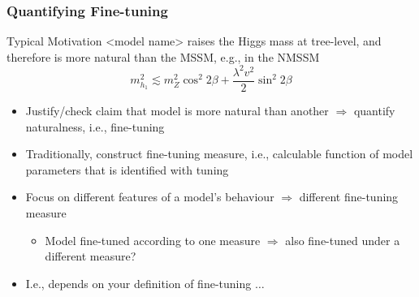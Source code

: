 \documentclass[10pt,aspectratio=169]{beamer}
\begin{document}
\begin{frame}
  \frametitle{Quantifying Fine-tuning}
  \begin{block}{Typical Motivation}
    <model name> raises the Higgs mass at tree-level, and
    therefore is more natural than the MSSM, e.g., in the NMSSM
    \begin{equation*}
      m_{h_1}^2 \lesssim m_Z^2 \cos^2 2\beta + \frac{\lambda^2 v^2}{2}
      \sin^2 2\beta
    \end{equation*}
  \end{block}
  \begin{itemize} \itemsep1em
  \item Justify/check claim that model is more natural than another
    $\Rightarrow$ quantify naturalness, i.e., fine-tuning
  \item Traditionally, construct {\color{blue} fine-tuning measure}, i.e.,
    calculable function of model parameters that is identified with tuning
  \item Focus on different features of a model's behaviour $\Rightarrow$
    different fine-tuning measure
    \begin{itemize}
    \item Model fine-tuned according to one measure $\Rightarrow$ also
      fine-tuned under a different measure?
    \end{itemize}
  \item \alert{I.e., depends on your definition of fine-tuning $\ldots$}
  \end{itemize}
\end{frame}
\end{document}
